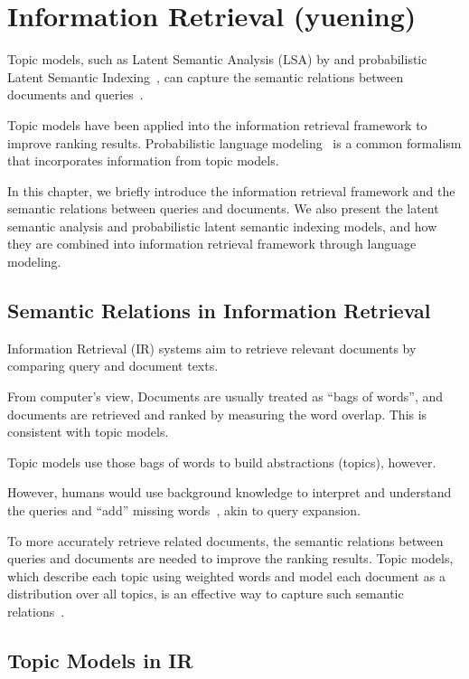 \chapter{Information Retrieval (yuening)}
\label{ch:ir}

Topic models, such as Latent Semantic Analysis (LSA) by \citep{deerwester-90} and probabilistic Latent Semantic Indexing~\cite{hofmann-99a}, can capture the semantic relations between documents and queries~\citep{wei-07}.

Topic models have been applied into the information retrieval framework to improve ranking results. Probabilistic language modeling~\citep{croft-03} is a common formalism that incorporates information from topic models.

In this chapter, we briefly introduce the information retrieval framework and the semantic relations between queries and documents. We also present the latent semantic analysis and probabilistic latent semantic indexing models, and how they are combined into information retrieval framework through language modeling.

\section{Semantic Relations in Information Retrieval}

Information Retrieval (IR) systems aim to retrieve relevant documents by comparing query and document texts.

From computer's view, Documents are usually treated as ``bags of words'', and documents are retrieved and ranked by measuring the word overlap. This is consistent with topic models.

Topic models use those bags of words to build abstractions (topics), however.

However, humans would use background knowledge to interpret and understand the queries and ``add'' missing words~\citep{wei-07}, akin to query expansion.

To more accurately retrieve related documents, the semantic relations between queries and documents are needed to improve the ranking results. Topic models, which describe each topic using weighted words and model each document as a distribution over all topics, is an effective way to capture such semantic relations~\citep{deerwester-90,hofmann-99a}.

\section{Topic Models in IR}

